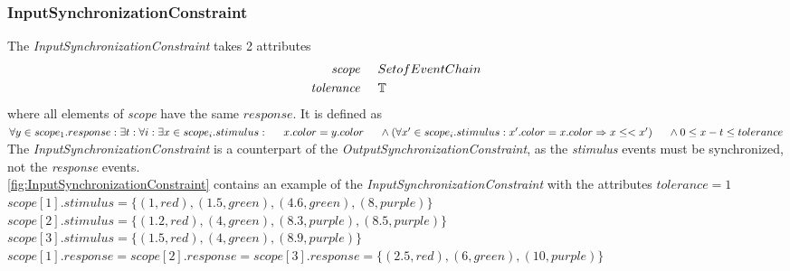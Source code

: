 	\subsubsection{InputSynchronizationConstraint}
	The \emph{InputSynchronizationConstraint} takes 2 attributes
	\begin{align*}
		\emph{scope} 	& \hspace{.5cm} Set of EventChain\\
		\emph{tolerance}& \hspace{.5cm} \mathbb{T}
	\end{align*}
	where all elements of \emph{scope} have the same $response$. It is defined as \\[10pt]
	\begin{math}
		\forall y\in scope_1.response: \exists t: \forall i: \exists x\in scope_i.stimulus:\\
		\text{\hspace{.5cm}} x.color = y.color\\
		\text{\hspace{.5cm}}\land (\forall x'\in scope_i.stimulus: x'.color=x.color \Rightarrow x\leq < x')\\
		\text{\hspace{.5cm}}\land 0\leq x-t\leq tolerance
	\end{math}\\[10pt]
	The \emph{InputSynchronizationConstraint} is a counterpart of the \emph{OutputSynchronizationConstraint}, as the \emph{stimulus} events must be synchronized, not the \emph{response} events.\\
	\ref{fig:InputSynchronizationConstraint} contains an example of the \emph{InputSynchronizationConstraint} with the attributes $tolerance=1$\\
	$scope[1].stimulus=\{(1, red), (1.5, green), (4.6, green), (8, purple)\}$\\
	$scope[2].stimulus=\{(1.2, red), (4, green), (8.3, purple), (8.5, purple)\}$\\
	$scope[3].stimulus=\{(1.5, red), (4, green), (8.9, purple)\}$\\
	$scope[1].response=scope[2].response=scope[3].response=\{(2.5, red), (6, green), (10, purple)\}$\\
